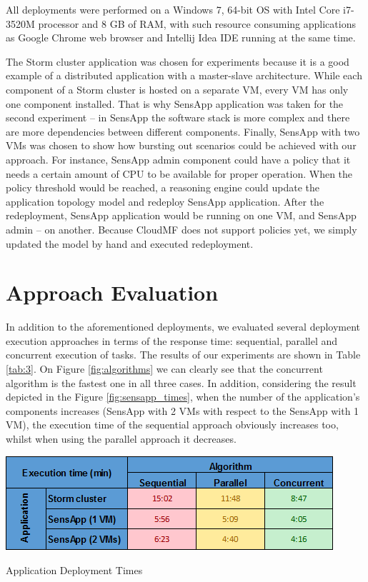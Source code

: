 \noindent All deployments were performed on a Windows 7, 64-bit OS with Intel Core i7-3520M processor and 8 GB of RAM, with such resource consuming applications as Google Chrome web browser and Intellij Idea IDE running at the same time. 

\noindent The Storm cluster application was chosen for experiments because it is a good example of a distributed application with a master-slave architecture. While each component of a Storm cluster is hosted on a separate VM, every VM has only one component installed. That is why SensApp application was taken for the second experiment -- in SensApp the software stack is more complex and there are more dependencies between different components. Finally, SensApp with two VMs was chosen to show how bursting out scenarios could be achieved with our approach. For instance, SensApp admin component could have a policy that it needs a certain amount of CPU to be available for proper operation. When the policy threshold would be reached, a reasoning engine could update the application topology model and redeploy SensApp application. After the redeployment, SensApp application would be running on one VM, and SensApp admin -- on another. Because CloudMF does not support policies yet, we simply updated the model by hand and executed redeployment.

\section{Approach Evaluation}

\noindent In addition to the aforementioned deployments, we evaluated several deployment execution approaches in terms of the response time: sequential, parallel and concurrent execution of tasks. The results of our experiments are shown in Table \ref{tab:3}. On Figure \ref{fig:algorithms} we can clearly see that the concurrent algorithm is the fastest one in all three cases. In addition, considering the result depicted in the Figure \ref{fig:sensapp_times}, when the number of the application's components increases (SensApp with 2 VMs with respect to the SensApp with 1 VM), the execution time of the sequential approach obviously increases too, whilst when using the parallel approach it decreases. 

\begin{center}	\includegraphics{./Figures/deployment_times}
	\begin{table}[htbp]
    \caption{Application Deployment Times}
    \label{tab:3}
	\end{table}
\end{center} 

